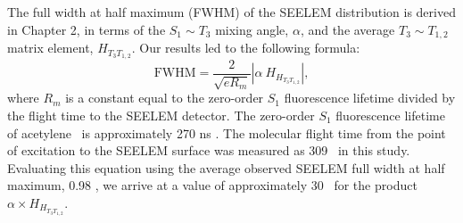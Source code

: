 \documentclass[12pt]{mitthesis}
\begin{document}
The full width at half maximum (FWHM) of the SEELEM distribution is
derived in Chapter 2, in terms of the $S_1 \sim T_3$ mixing angle,
$\alpha$, and the average $T_3 \sim T_{1,2}$ matrix element,
$H_{T_3T_{1,2}}$.  Our results led to the following formula:
\begin{equation}
  \text{FWHM} = 
    \frac{2}{\sqrt{e R_m}} 
    \left \lvert 
      \alpha \: H_{H_{T_3T_{1,2}}}
    \right \rvert, 
\end{equation}
where $R_m$ is a constant equal to the zero-order $S_1$ fluorescence
lifetime divided by the flight time to the SEELEM detector.  The
zero-order $S_1$ fluorescence lifetime of acetylene \astate\ is
approximately 270 ns \cite{ochi91}.  The molecular flight time from
the point of excitation to the SEELEM surface was measured as 309
\microsec\ in this study.  Evaluating this equation using the average
observed SEELEM full width at half maximum, 0.98 \rcm, we arrive at a
value of approximately 30 \rcm\ for the product $\alpha \times
H_{H_{T_3T_{1,2}}}$.

\end{document}
